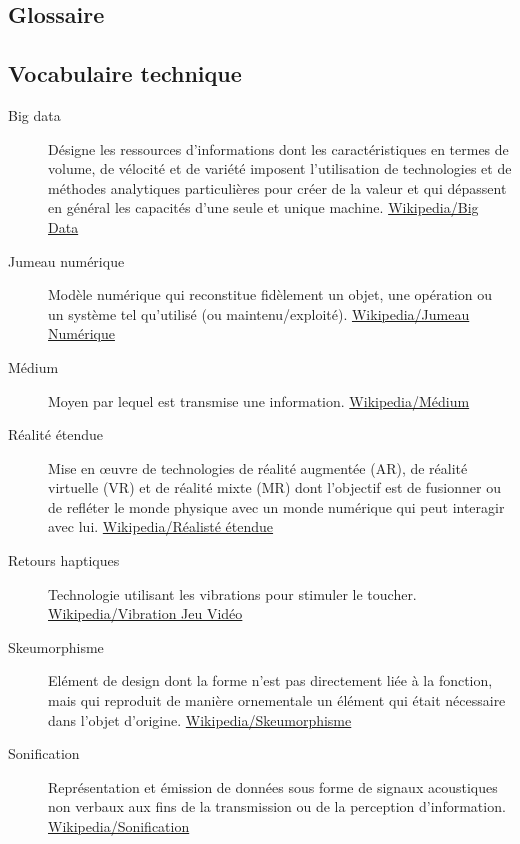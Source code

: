 \documentclass[a4paper,12pt]{article}
\begin{document}
\begin{multicols}{2}
\section*{Glossaire}
\label{sec:org6e3b433}
\subsection*{Vocabulaire technique}
\label{sec:org7ec9668}
\begin{description}
\item[{Big data}] Désigne les ressources d’informations dont les caractéristiques en termes de volume, de vélocité et de variété imposent l’utilisation de technologies et de méthodes analytiques particulières pour créer de la valeur et qui dépassent en général les capacités d'une seule et unique machine. \href{https://fr.wikipedia.org/wiki/Big\_data}{Wikipedia/Big Data}
\item[{Jumeau numérique}] Modèle numérique qui reconstitue fidèlement un objet, une opération ou un système tel qu'utilisé (ou maintenu/exploité). \href{https://fr.wikipedia.org/wiki/Jumeau\_num\%C3\%A9rique}{Wikipedia/Jumeau Numérique}
\item[{Médium}] Moyen par lequel est transmise une information. \href{https://fr.wikipedia.org/wiki/M\%C3\%A9dium}{Wikipedia/Médium}
\item[{Réalité étendue}] Mise en œuvre de technologies de réalité augmentée (AR), de réalité virtuelle (VR) et de réalité mixte (MR) dont l'objectif est de fusionner ou de refléter le monde physique avec un monde numérique qui peut interagir avec lui. \href{https://fr.wikipedia.org/wiki/R\%C3\%A9alit\%C3\%A9\_\%C3\%A9tendue}{Wikipedia/Réalisté étendue}
\item[{Retours haptiques}] Technologie utilisant les vibrations pour stimuler le toucher. \href{https://fr.wikipedia.org/wiki/Vibration\_(jeu\_vid\%C3\%A9o)\#Retour\_haptique}{Wikipedia/Vibration Jeu Vidéo}
\item[{Skeumorphisme}] Elément de design dont la forme n'est pas directement liée à la fonction, mais qui reproduit de manière ornementale un élément qui était nécessaire dans l'objet d'origine. \href{https://fr.wikipedia.org/wiki/Skeuomorphisme}{Wikipedia/Skeumorphisme}
\item[{Sonification}] Représentation et émission de données sous forme de signaux acoustiques non verbaux aux fins de la transmission ou de la perception d’information. \href{https://fr.wikipedia.org/wiki/Sonification}{Wikipedia/Sonification}
\end{description}

\end{multicols}
\end{document}
